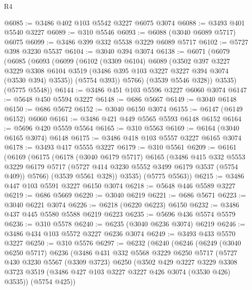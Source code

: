 \begin{lexlean}{R4}
\begin{coremodule}
@6085 := @3486 @402 @103 @5542 @3227 @6075 @3074
@6088 := @3493 @401 @5540 @3227
@6089 := @310 @5546
@6093 := @6088 (@3040 @6089 @5717) @6075
@6099 := @3486 @399 @332 @5538 @3229 @6089 @5717
@6102 := @5727 @398 @3230 @5537
@6104 := @3040 @394 @3074
@6138 := @6071
    (@6079
      (@6085
        (@6093
          (@6099
            (@6102
              (@3309 @6104)
              @6089
              (@3502
                @397
                @3227
                @3229
                @3308
                @6104
                @3519
                (@3486 @395 @103 @3227 @3227 @394 @3074 (@3530 @394) @3535))
              (@5754 @393))
            @5766)
          (@3539 @5546 @328))
        @3535)
      (@5775 @5548))
@6144 := @3486 @451 @103 @5596 @3227 @6060 @3074
@6147 := @5648 @450 @5594 @3227
@6148 := @686 @5667
@6149 := @3040 @6148
@6150 := @686 @5672
@6152 := @3040 @6150 @3074
@6155 := @6147 (@6149 @6152) @6060
@6161 := @3486 @421 @449 @5565 @5593 @6148 @6152
@6164 := @5696 @420 @5559 @5564
@6165 := @310 @5563
@6169 := @6164 (@3040 @6165 @3074) @6148
@6175 := @3486 @418 @103 @5557 @3227 @6165 @3074
@6178 := @3493 @417 @5555 @3227
@6179 := @310 @5561
@6209 := @6161
    (@6169
      (@6175
        (@6178
          (@3040 @6179 @5717)
          @6165
          (@3486
            @415
            @332
            @5553
            @3229
            @6179
            @5717
            (@5727 @414 @3230 @5552 @3499 @6179 @3537 (@5754 @409))
            @5766)
          (@3539 @5561 @328))
        @3535)
      (@5775 @5563))
@6215 := @3486 @447 @103 @5591 @3227 @6150 @3074
@6218 := @5648 @446 @5589 @3227
@6219 := @686 @5669
@6220 := @3040 @6219
@6221 := @686 @5671
@6223 := @3040 @6221 @3074
@6226 := @6218 (@6220 @6223) @6150
@6232 := @3486 @437 @445 @5580 @5588 @6219 @6223
@6235 := @5696 @436 @5574 @5579
@6236 := @310 @5578
@6240 := @6235 (@3040 @6236 @3074) @6219
@6246 := @3486 @434 @103 @5572 @3227 @6236 @3074
@6249 := @3493 @433 @5570 @3227
@6250 := @310 @5576
@6297 := @6232
    (@6240
      (@6246
        (@6249
          (@3040 @6250 @5717)
          @6236
          (@3486
            @431
            @332
            @5568
            @3229
            @6250
            @5717
            (@5727
              @430
              @3230
              @5567
              (@3309 @3723)
              @6250
              (@3502
                @429
                @3227
                @3229
                @3308
                @3723
                @3519
                (@3486 @427 @103 @3227 @3227 @426 @3074 (@3530 @426) @3535))
              (@5754 @425))

\end{coremodule}
\end{lexlean}
